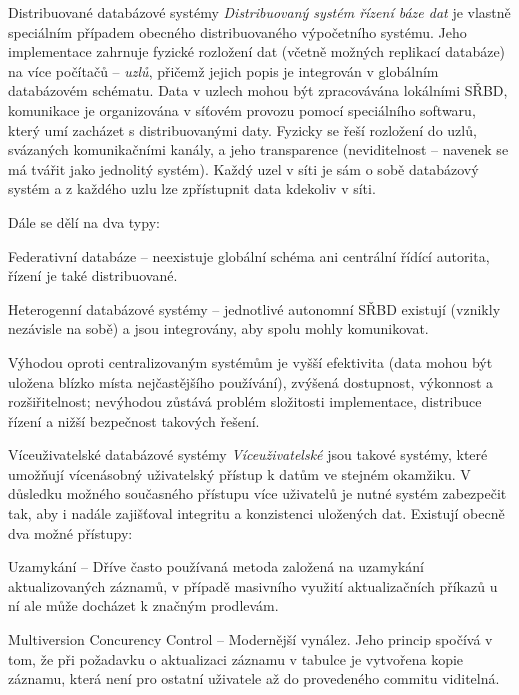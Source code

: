 \begin{obecne}{Distribuované databázové systémy}
\emph{Distribuovaný systém řízení báze dat} je vlastně speciálním případem obecného distribuovaného výpočetního systému. Jeho implementace zahrnuje fyzické rozložení dat (včetně možných replikací databáze) na více počítačů -- \emph{uzlů}, přičemž jejich popis je integrován v globálním databázovém schématu. Data v uzlech mohou být zpracovávána lokálními SŘBD, komunikace je organizována v síťovém provozu pomocí speciálního softwaru, který umí zacházet s distribuovanými daty. Fyzicky se řeší rozložení do uzlů, svázaných komunikačními kanály, a jeho transparence (neviditelnost -- navenek se má tvářit jako jednolitý systém). Každý uzel v síti je sám o sobě databázový systém a z každého uzlu lze zpřístupnit data kdekoliv v síti.

Dále se dělí na dva typy:
\begin{pitemize}
    \item Federativní databáze -- neexistuje globální schéma ani centrální řídící autorita, řízení je také distribuované.
    \item Heterogenní databázové systémy -- jednotlivé autonomní SŘBD existují (vznikly nezávisle na sobě) a jsou integrovány, aby spolu mohly komunikovat.
\end{pitemize}

Výhodou oproti centralizovaným systémům je vyšší efektivita (data mohou být uložena blízko místa nejčastějšího používání), zvýšená dostupnost, výkonnost a rozšiřitelnost; nevýhodou zůstává problém složitosti implementace, distribuce řízení a nižší bezpečnost takových řešení.
\end{obecne}

\begin{obecne}{Víceuživatelské databázové systémy}
\emph{Víceuživatelské} jsou takové systémy, které umožňují vícenásobný uživatelský přístup k datům ve stejném okamžiku. V důsledku možného současného přístupu více uživatelů je nutné systém zabezpečit tak, aby i nadále zajišťoval integritu a konzistenci uložených dat. Existují obecně dva možné přístupy:
\begin{pitemize}
    \item Uzamykání -- Dříve často používaná metoda založená na uzamykání aktualizovaných záznamů, v případě masivního využití aktualizačních příkazů u ní ale může docházet k značným prodlevám. 
    \item Multiversion Concurency Control -- Modernější vynález. Jeho princip spočívá v tom, že při požadavku o aktualizaci záznamu v tabulce je vytvořena kopie záznamu, která není pro ostatní uživatele až do provedeného commitu viditelná.
\end{pitemize}
\end{obecne}
